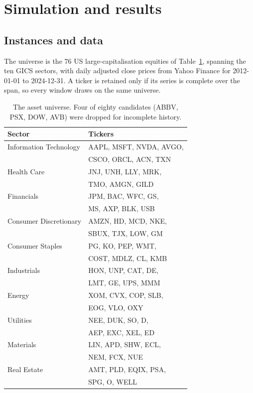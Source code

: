 \section{\label{sec:results}Simulation and results}

\subsection{\label{sec:data}Instances and data}
The universe is the $76$ US large-capitalisation equities of
Table~\ref{tab:universe}, spanning the ten GICS sectors, with daily
adjusted close prices from Yahoo Finance for 2012-01-01 to 2024-12-31.
A ticker is retained only if its series is complete over the span, so
every window draws on the same universe.

\begin{table}[t]
  \caption{The asset universe. Four of eighty candidates (ABBV, PSX,
  DOW, AVB) were dropped for incomplete history.}
  \label{tab:universe}
  \footnotesize
  \begin{ruledtabular}
  \begin{tabular}{ll}
    Sector & Tickers \\ \hline
    Information Technology & AAPL, MSFT, NVDA, AVGO, \\
                           & CSCO, ORCL, ACN, TXN \\
    Health Care            & JNJ, UNH, LLY, MRK, \\
                           & TMO, AMGN, GILD \\
    Financials             & JPM, BAC, WFC, GS, \\
                           & MS, AXP, BLK, USB \\
    Consumer Discretionary & AMZN, HD, MCD, NKE, \\
                           & SBUX, TJX, LOW, GM \\
    Consumer Staples       & PG, KO, PEP, WMT, \\
                           & COST, MDLZ, CL, KMB \\
    Industrials            & HON, UNP, CAT, DE, \\
                           & LMT, GE, UPS, MMM \\
    Energy                 & XOM, CVX, COP, SLB, \\
                           & EOG, VLO, OXY \\
    Utilities              & NEE, DUK, SO, D, \\
                           & AEP, EXC, XEL, ED \\
    Materials              & LIN, APD, SHW, ECL, \\
                           & NEM, FCX, NUE \\
    Real Estate            & AMT, PLD, EQIX, PSA, \\
                           & SPG, O, WELL \\
  \end{tabular}
  \end{ruledtabular}
\end{table}

